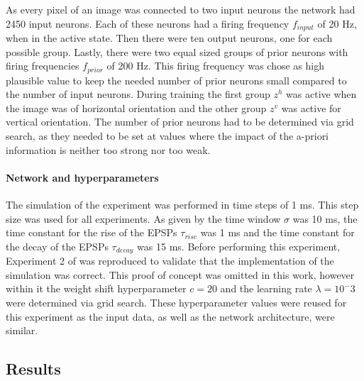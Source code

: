 As every pixel of an image was connected to two input neurons the network had 2450 input neurons. Each of these neurons had a firing frequency $f_{input}$ of 20 Hz, when in the active state. Then there were ten output neurons, one for each possible group. Lastly, there were two equal sized groups of prior neurons with firing frequencies $f_{prior}$ of 200 Hz. This firing frequency was chose as high plausible value to keep the needed number of prior neurons small compared to the number of input neurons. During training the first group $z^h$ was active when the image was of horizontal orientation and the other group $z^v$ was active for vertical orientation. The number of prior neurons had to be determined via grid search, as they needed to be set at values where the impact of the a-priori information is neither too strong nor too weak.

\paragraph{Network and hyperparameters}

The simulation of the experiment was performed in time steps of 1 ms. This step size was used for all experiments. As given by \citet{nessler} the time window $\sigma$ was 10 ms, the time constant for the rise of the EPSPs $\tau_{rise}$ was 1 ms and the time constant for the decay of the EPSPs $\tau_{decay}$ was 15 ms. Before performing this experiment, Experiment 2 of \citet{nessler} was reproduced to validate that the implementation of the simulation was correct. This proof of concept was omitted in this work, however within it the weight shift hyperparameter $c = 20$ and the learning rate $\lambda = 10^-3$ were determined via grid search. These hyperparameter values were reused for this experiment as the input data, as well as the network architecture, were similar.

\subsection{Results}

